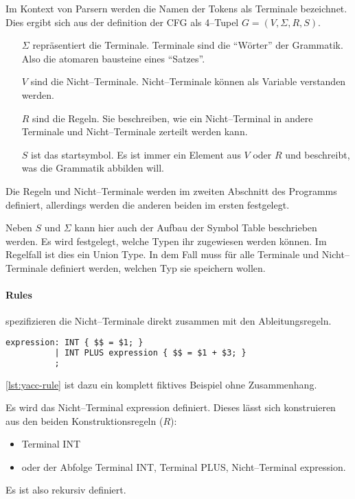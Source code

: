 Im Kontext von Parsern werden die Namen der Tokens als Terminale bezeichnet.
Dies ergibt sich aus der definition der \ac{CFG} als 4--Tupel $G=(V,\Sigma,R,S)$.~\autocite{sipser-1997}
\begin{itemize}
    \item[$\Sigma$] repräsentiert die Terminale.
    Terminale sind die \enquote{Wörter} der Grammatik.
    Also die atomaren bausteine eines \enquote{Satzes}.
    \item[$V$] sind die Nicht--Terminale.
    Nicht--Terminale können als Variable verstanden werden.
    \item[$R$] sind die Regeln.
    Sie beschreiben, wie ein Nicht--Terminal in andere Terminale und Nicht--Terminale zerteilt werden kann.
    \item[$S$] ist das startsymbol.
    Es ist immer ein Element aus $V$ oder $R$ und beschreibt, was die Grammatik abbilden will.
\end{itemize}
Die Regeln und Nicht--Terminale werden im zweiten Abschnitt des Programms definiert, allerdings werden die anderen beiden im ersten festgelegt.

Neben $S$ und $\Sigma$ kann hier auch der Aufbau der Symbol Table beschrieben werden.
Es wird festgelegt, welche Typen ihr zugewiesen werden können.
Im Regelfall ist dies ein Union Type.
In dem Fall muss für alle Terminale und Nicht--Terminale definiert werden, welchen Typ sie speichern wollen.

\paragraph{Rules} spezifizieren die Nicht--Terminale direkt zusammen mit den Ableitungsregeln.
\begin{lstlisting}[label={lst:yacc-rule},caption={\acs{YACC} Regel},language=yacc]
expression: INT { $$ = $1; }
          | INT PLUS expression { $$ = $1 + $3; }
          ;
\end{lstlisting}
\autoref{lst:yacc-rule} ist dazu ein komplett fiktives Beispiel ohne Zusammenhang.

Es wird das Nicht--Terminal {\ttfamily expression} definiert.
Dieses lässt sich konstruieren aus den beiden Konstruktionsregeln ($R$):
\begin{itemize}
    \item Terminal {\ttfamily INT}
    \item oder der Abfolge Terminal {\ttfamily INT}, Terminal {\ttfamily PLUS}, Nicht--Terminal {\ttfamily expression}.
\end{itemize}
Es ist also rekursiv definiert.

